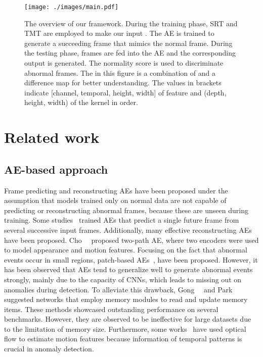 \documentclass[10pt,twocolumn,letterpaper]{article}
\begin{document}
\begin{figure*}[!ht]
	\begin{center}
		\texttt{[image: ./images/main.pdf]}
	\end{center}
	\caption{The overview of our framework. During the training phase, SRT and TMT are employed to make our input . The AE is trained to generate a succeeding frame that mimics the normal frame. During the testing phase, frames are fed into the AE and the corresponding output  is generated. The normality score  is used to discriminate abnormal frames. The  in this figure is a combination of  and a difference map for better understanding. The values in brackets indicate [channel, temporal, height, width] of feature and  (depth, height, width) of the kernel in order. }
	\label{modelarchitecture}
\end{figure*}

\vspace{-0.3em}

\vspace{-0.9em}
\section{Related work}
\subsection{AE-based approach}
Frame predicting and reconstructing AEs have been proposed under the assumption that models trained only on normal data are not capable of predicting or reconstructing abnormal frames, because these are unseen during training. Some studies~\cite{Liu_2018_CVPR, tang2020integrating, park2020learning, lu2019future} trained AEs that predict a single future frame from several successive input frames. Additionally, many effective reconstructing AEs~\cite{nguyen2019hybrid, zaheer2020old, park2020learning, cho2020unsupervised} have been proposed. Cho~\etal~\cite{cho2020unsupervised} proposed two-path AE, where two encoders were used to model appearance and motion features. Focusing on the fact that abnormal events occur in small regions, patch-based AEs~\cite{zaheer2020old, xu2017detecting, nguyen2019hybrid, fan2020video}, have been proposed. However, it has been observed that AEs tend to generalize well to generate abnormal events strongly, mainly due to the capacity of CNNs, which leads to missing out on anomalies during detection. To alleviate this drawback, Gong~\etal~\cite{gong2019memorizing} and Park~\etal~\cite{park2020learning} suggested networks that employ memory modules to read and update memory items. These methods showcased outstanding performance on several benchmarks. However, they are observed to be ineffective for large datasets due to the limitation of memory size. Furthermore, some works~\cite{Liu_2018_CVPR, ravanbakhsh2017abnormal, ravanbakhsh2019training, ravanbakhsh2018plug} have used optical flow to estimate motion features because information of temporal patterns is crucial in anomaly detection.  
\end{document}
